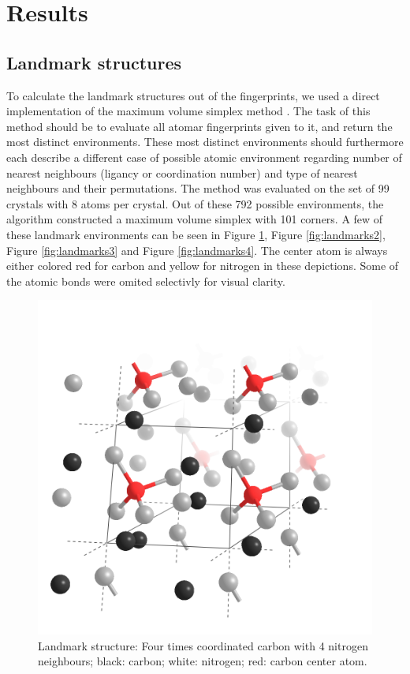\newpage
\section{Results}
\subsection{Landmark structures}

To calculate the landmark structures out of the fingerprints, we used a direct implementation of the maximum volume simplex method \cite{Behnam2020}. The task of this method should be to evaluate all atomar fingerprints given to it, and return the most distinct environments. These most distinct environments should furthermore each describe a different case of possible atomic environment regarding number of nearest neighbours (ligancy or coordination number) and type of nearest neighbours and their permutations. The method was evaluated on the set of 99 crystals with 8 atoms per crystal. Out of these 792 possible environments, the algorithm constructed a maximum volume simplex with 101 corners. A few of these landmark environments can be seen in Figure \ref{fig:landmarks1}, Figure \ref{fig:landmarks2}, Figure \ref{fig:landmarks3} and Figure \ref{fig:landmarks4}. The center atom is always either colored red for carbon and yellow for nitrogen in these depictions. Some of the atomic bonds were omited selectivly for visual clarity.


\begin{figure}[h!]

\center
\includegraphics[width=\linewidth]{Figures/landmark1.png}
\caption{Landmark structure: Four times coordinated carbon with 4 nitrogen neighbours; black: carbon; white: nitrogen; red: carbon center atom. }
\label{fig:landmarks1}
\end{figure}

